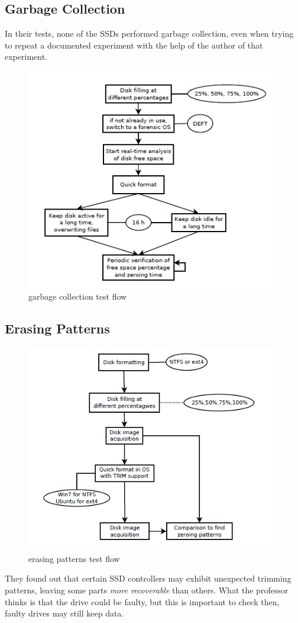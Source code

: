     \subsection{Garbage Collection}
        In their tests, none of the SSDs performed garbage collection, even when trying to repeat a documented experiment with the help of the author of that experiment.
        \begin{figure}[ht!]
            \centering
            \includegraphics[width=0.5\linewidth]{garbage.png}
            \caption{garbage collection test flow}
        \end{figure}
    \subsection{Erasing Patterns}
        \begin{figure}[ht!]
            \centering
            \includegraphics[width=0.5\linewidth]{patterns.png}
            \caption{erasing patterns test flow}
        \end{figure}
        They found out that certain SSD controllers may exhibit unexpected trimming patterns, leaving some parts \textit{more recoverable} than others. What the professor thinks is that the drive could be faulty, but this is important to check then, faulty drives may still keep data.
